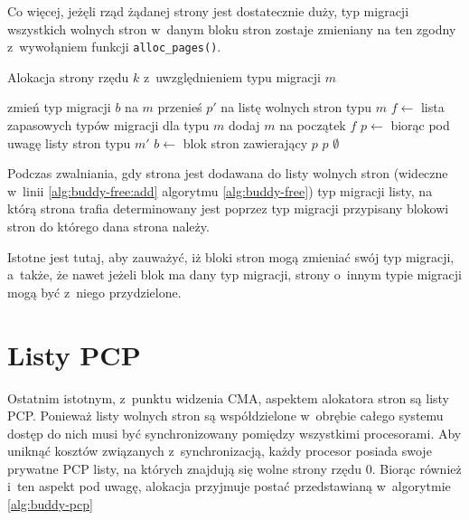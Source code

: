 Co więcej, jeżęli rząd żądanej strony jest dostatecznie duży, typ
migracji wszystkich wolnych stron w~danym bloku stron zostaje
zmieniany na ten zgodny z~wywołąniem funkcji
\lstinline|alloc_pages()|.

\begin{algorithm}\label{alg:buddy-fallback}
\caption{Alokacja strony rzędu $k$ z~uwzględnieniem typu migracji $m$}
\begin{algorithmic}[1]
\State zmień typ migracji $b$ na $m$
    \State przenieś $p'$ na listę wolnych stron typu $m$
\EndFor
\EndFunction
\Statex
{}
    \State $f \gets$ lista zapasowych typów migracji dla typu $m$
    \State dodaj $m$ na początek $f$
        \State $p \gets$  biorąc pod uwagę listy stron typu $m'$
                \State $b \gets$ blok stron zawierający $p$
                \State {}
            \EndIf
            \State \Return $p$
        \EndIf
    \EndFor
    \State \Return $\emptyset$
\EndFunction
\end{algorithmic}
\end{algorithm}

Podczas zwalniania, gdy strona jest dodawana do listy wolnych stron
(wideczne w~linii \ref{alg:buddy-free:add} algorytmu
\ref{alg:buddy-free}) typ migracji listy, na którą strona trafia
determinowany jest poprzez typ migracji przypisany blokowi stron do
którego dana strona należy.

Istotne jest tutaj, aby zauważyć, iż bloki stron mogą zmieniać swój
typ migracji, a~także, że nawet jeżeli blok ma dany typ migracji,
strony o~innym typie migracji mogą być z~niego przydzielone.


\section{Listy PCP}

Ostatnim istotnym, z~punktu widzenia CMA, aspektem alokatora stron są
listy PCP.  Ponieważ listy wolnych stron są współdzielone w~obrębie
całego systemu dostęp do nich musi być synchronizowany pomiędzy
wszystkimi procesorami.  Aby uniknąć kosztów związanych
z~synchronizacją, każdy procesor posiada swoje prywatne PCP listy, na
których znajdują się wolne strony rzędu 0.  Biorąc również i~ten
aspekt pod uwagę, alokacja przyjmuje postać przedstawianą w~algorytmie
\ref{alg:buddy-pcp}

